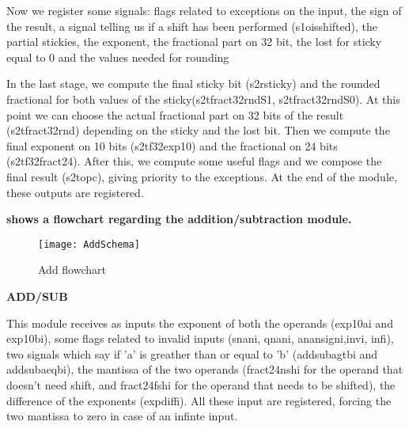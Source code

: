 Now we register some signals: flags related to exceptions on the input, the sign of the result, a signal telling us if a shift has been performed (s1o\textunderscore is\textunderscore shifted), the partial stickies, the exponent, the fractional part on 32 bit, the lost for sticky equal to 0 and the values needed for rounding

In the last stage, we compute the final sticky bit (s2r\textunderscore sticky) and the rounded fractional for both values of the sticky(s2t\textunderscore fract32\textunderscore rndS1, s2t\textunderscore fract32\textunderscore rndS0). At this point we can choose the actual fractional part on 32 bits of the result (s2t\textunderscore fract32\textunderscore rnd) depending on the sticky and the lost bit.
Then we compute the final exponent on 10 bits (s2t\textunderscore f32\textunderscore exp10) and the fractional on 24 bits (s2t\textunderscore f32\textunderscore fract24).
After this, we compute some useful flags and we compose the final result (s2t\textunderscore opc), giving priority to the exceptions. At the end of the module, these outputs are registered.
\newline

\textbf{
 shows a flowchart regarding the addition/subtraction module.}
\newline

\begin{figure}
\centering\texttt{[image: AddSchema]}
\caption{Add flowchart}	
\label{fig:add_schema}
\end{figure}

\textbf{ADD/SUB}
\newline

This module receives as inputs the exponent of both the operands (exp10a\textunderscore i and exp10b\textunderscore i), some flags related to invalid inputs (snan\textunderscore i, qnan\textunderscore i, anan\textunderscore sign\textunderscore i,inv\textunderscore i, inf\textunderscore i), two signals which say if 'a' is greather than or equal to 'b' (addsub\textunderscore agtb\textunderscore i and addsub\textunderscore aeqb\textunderscore i), the mantissa of the two operands (fract24nsh\textunderscore i for the operand that doesn't need shift, and fract24fsh\textunderscore i for the operand that needs to be shifted), the difference of the exponents (exp\textunderscore diff\textunderscore i). All these input are registered, forcing the two mantissa to zero in case of an infinte input.


